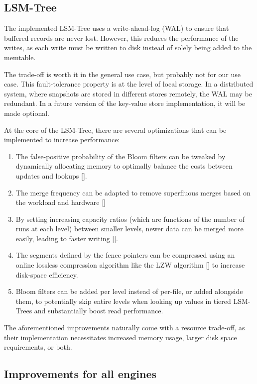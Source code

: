 \subsection{LSM-Tree}

The implemented LSM-Tree uses a write-ahead-log (WAL) to ensure that buffered records are never lost. However, this reduces the performance of the writes, as each write must be written to disk instead of solely being added to the memtable.

The trade-off is worth it in the general use case, but probably not for our use case. This fault-tolerance property is at the level of local storage. In a distributed system, where snapshots are stored in different stores remotely, the WAL may be redundant. In a future version of the key-value store implementation, it will be made optional.

At the core of the LSM-Tree, there are several optimizations that can be implemented to increase performance:

\begin{enumerate}
    \item The false-positive probability of the Bloom filters can be tweaked by dynamically allocating memory to optimally balance the costs between updates and lookups [\cite{lsm-monkey}].
    \item The merge frequency can be adapted to remove superfluous merges based on the workload and hardware [\cite{lsm-dostoevsky}]
    \item By setting increasing capacity ratios (which are functions of the number of runs at each level) between smaller levels, newer data can be merged more easily, leading to faster writing [\cite{lsm-wacky}].
    \item The segments defined by the fence pointers can be compressed using an online lossless compression algorithm like the LZW algorithm [\cite{lzw}] to increase disk-space efficiency.
    \item Bloom filters can be added per level instead of per-file, or added alongside them, to potentially skip entire levels when looking up values in tiered LSM-Trees and substantially boost read performance.
\end{enumerate}

The aforementioned improvements naturally come with a resource trade-off, as their implementation necessitates increased memory usage, larger disk space requirements, or both.

\subsection{Improvements for all engines}

